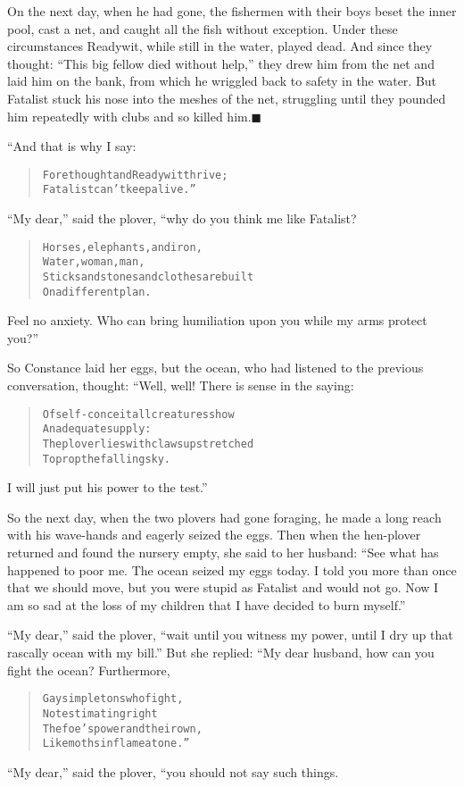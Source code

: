 \documentclass[article, twoside, 14pt]{memoir}
\newcommand{\qed}{\hfill \ensuremath{\blacksquare}}
\renewenvironment{verbatim}{%
\begin{quote}%
\vskip -10pt%
\begin{alltt}\normalfont\large}{\end{alltt}%
\end{quote}%
\vskip -10pt
} %
\begin{document}
On the next day, when he had gone, the fishermen with their boys
beset the inner pool, cast a net, and caught all the fish without
exception. Under these circumstances Readywit, while still in the
water, played dead. And since they thought:
``This big fellow died without help,'' they drew him from the net
and laid him on the bank, from which he wriggled back to safety in
the water. But Fatalist stuck his nose into the meshes of the net,
struggling until they pounded him repeatedly with clubs and so
killed him.\hyperref[s20]{\qed}

“And that is why I say:

\begin{verbatim}
Forethought and Readywit thrive;
Fatalist can't keep alive.”
\end{verbatim}
``My dear,'' said the plover, “why do you think me like Fatalist?

\begin{verbatim}
Horses, elephants, and iron,
Water, woman, man,
Sticks and stones and clothes are built
On a different plan.
\end{verbatim}
Feel no anxiety. Who can bring humiliation upon you while my
arms protect you?”

So Constance laid her eggs, but the ocean, who had listened to the
previous conversation, thought: “Well, well! There is sense in the
saying:

\begin{verbatim}
Of self-conceit all creatures show
    An adequate supply:
The plover lies with claws upstretched
    To prop the falling sky.
\end{verbatim}
I will just put his power to the test.”

So the next day, when the two plovers had gone foraging, he made a
long reach with his wave-hands and eagerly seized the eggs. Then
when the hen-plover returned and found the nursery empty, she said
to her husband:
``See what has happened to poor me. The ocean seized my eggs today. I told you more than once that we should move, but you were stupid as Fatalist and would not go. Now I am so sad at the loss of my children that I have decided to burn myself.''

``My dear,'' said the plover,
``wait until you witness my power, until I dry up that rascally ocean with my bill.''
But she replied: “My dear husband, how can you fight the ocean?
Furthermore,

\begin{verbatim}
Gay simpletons who fight,
Not estimating right
The foe's power and their own,
Like moths in flame atone.”
\end{verbatim}
``My dear,'' said the plover, “you should not say such things.
\end{document}
